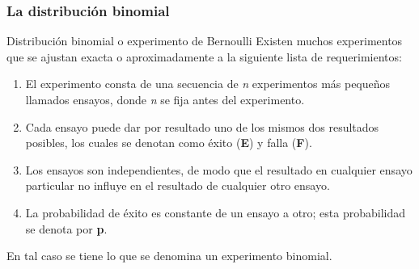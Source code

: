 \documentclass[11pt]{beamer}
\begin{document}
        \subsubsection*{La distribución binomial}
          \begin{frame}{Distribución binomial o experimento de Bernoulli}
            Existen muchos experimentos que se ajustan exacta o aproximadamente a la siguiente lista
de requerimientos:
            \begin{enumerate}
                \item El experimento consta de una secuencia de \textit{n} experimentos más pequeños llamados ensayos, donde \textit{n} se fija antes del experimento.
                \item Cada ensayo puede dar por resultado uno de los mismos dos resultados posibles, los cuales se denotan como éxito (\textbf{E}) y falla (\textbf{F}).
                \item Los ensayos son independientes, de modo que el resultado en cualquier ensayo particular no influye en el resultado de cualquier otro ensayo.
                \item La probabilidad de éxito es constante de un ensayo a otro; esta probabilidad se denota por \textbf{p}.
            \end{enumerate}
            En tal caso se tiene lo que se denomina un experimento binomial.
          \end{frame}
\end{document}
